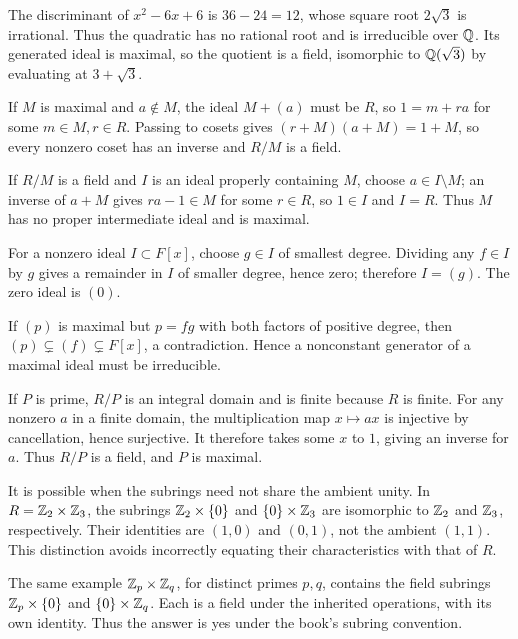 The discriminant of $x^2-6x+6$ is $36-24=12$, whose square root $2\sqrt3$ is irrational. Thus the quadratic has no rational root and is irreducible over $\mathbb{Q}$. Its generated ideal is maximal, so the quotient is a field, isomorphic to $\mathbb{Q}(\sqrt3)$ by evaluating at $3+\sqrt3$.

If $M$ is maximal and $a\notin M$, the ideal $M+(a)$ must be $R$, so $1=m+ra$ for some $m\in M,r\in R$. Passing to cosets gives $(r+M)(a+M)=1+M$, so every nonzero coset has an inverse and $R/M$ is a field.

If $R/M$ is a field and $I$ is an ideal properly containing $M$, choose $a\in I\setminus M$; an inverse of $a+M$ gives $ra-1\in M$ for some $r\in R$, so $1\in I$ and $I=R$. Thus $M$ has no proper intermediate ideal and is maximal.

For a nonzero ideal $I\subset F[x]$, choose $g\in I$ of smallest degree. Dividing any $f\in I$ by $g$ gives a remainder in $I$ of smaller degree, hence zero; therefore $I=(g)$. The zero ideal is $(0)$.

If $(p)$ is maximal but $p=fg$ with both factors of positive degree, then $(p)\subsetneq(f)\subsetneq F[x]$, a contradiction. Hence a nonconstant generator of a maximal ideal must be irreducible.

If $P$ is prime, $R/P$ is an integral domain and is finite because $R$ is finite. For any nonzero $a$ in a finite domain, the multiplication map $x\mapsto ax$ is injective by cancellation, hence surjective. It therefore takes some $x$ to $1$, giving an inverse for $a$. Thus $R/P$ is a field, and $P$ is maximal.

It is possible when the subrings need not share the ambient unity. In $R=\mathbb{Z}_2\times\mathbb{Z}_3$, the subrings $\mathbb{Z}_2\times\{0\}$ and $\{0\}\times\mathbb{Z}_3$ are isomorphic to $\mathbb{Z}_2$ and $\mathbb{Z}_3$, respectively. Their identities are $(1,0)$ and $(0,1)$, not the ambient $(1,1)$. This distinction avoids incorrectly equating their characteristics with that of $R$.

The same example $\mathbb{Z}_p\times\mathbb{Z}_q$, for distinct primes $p,q$, contains the field subrings $\mathbb{Z}_p\times\{0\}$ and $\{0\}\times\mathbb{Z}_q$. Each is a field under the inherited operations, with its own identity. Thus the answer is yes under the book's subring convention.

